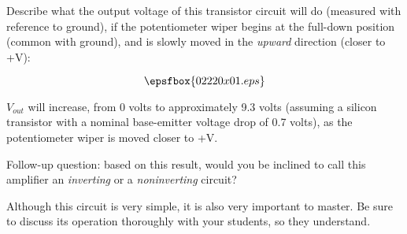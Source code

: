 

Describe what the output voltage of this transistor circuit will do (measured with reference to ground), if the potentiometer wiper begins at the full-down position (common with ground), and is slowly moved in the {\it upward} direction (closer to +V):

$$\epsfbox{02220x01.eps}$$







$V_{out}$ will increase, from 0 volts to approximately 9.3 volts (assuming a silicon transistor with a nominal base-emitter voltage drop of 0.7 volts), as the potentiometer wiper is moved closer to +V.

\vskip 10pt

Follow-up question: based on this result, would you be inclined to call this amplifier an {\it inverting} or a {\it noninverting} circuit?







Although this circuit is very simple, it is also very important to master.  Be sure to discuss its operation thoroughly with your students, so they understand.




